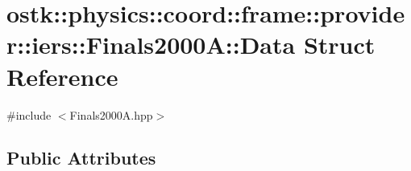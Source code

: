 \hypertarget{structostk_1_1physics_1_1coord_1_1frame_1_1provider_1_1iers_1_1_finals2000_a_1_1_data}{}\section{ostk\+:\+:physics\+:\+:coord\+:\+:frame\+:\+:provider\+:\+:iers\+:\+:Finals2000A\+:\+:Data Struct Reference}
\label{structostk_1_1physics_1_1coord_1_1frame_1_1provider_1_1iers_1_1_finals2000_a_1_1_data}


{\ttfamily \#include $<$Finals2000\+A.\+hpp$>$}

\subsection*{Public Attributes}
